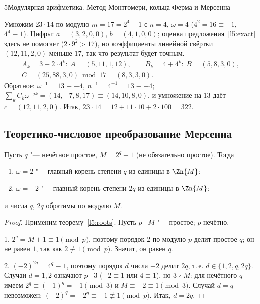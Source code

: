 \begin{lecture}{5}{Модулярная арифметика. Метод Монтгомери, кольца Ферма и Мерсенна}
\begin{example}\label{l5:ntt17}
Умножим $23 \cdot 14$ по модулю $m = 17 = 2^4 + 1$ с $n = 4$, $\omega = 4$
($4^2 = 16 \equiv -1$, $4^4 \equiv 1$). Цифры: $a = (3, 2, 0, 0)$, $b = (4, 1, 0, 0)$;
оценка предложения~\ref{l5:exact} здесь не помогает ($2 \cdot 9^2 > 17$), но коэффициенты
линейной свёртки $(12, 11, 2, 0)$ меньше $17$, так что результат будет точным.
\begin{gather*}
  A_k = 3 + 2 \cdot 4^k:\ A = (5, 11, 1, 12), \qquad
  B_k = 4 + 4^k:\ B = (5, 8, 3, 0),\\
  C = (25, 88, 3, 0) \bmod 17 = (8, 3, 3, 0).
\end{gather*}
Обратное: $\omega^{-1} = 13 \equiv -4$, $n^{-1} = 4^{-1} = 13 \equiv -4$;
$\sum_k C_k \omega^{-jk} = (14, -7, 8, 17) \equiv (14, 10, 8, 0)$, и умножение на $13$ даёт
$c = (12, 11, 2, 0)$. Итак, $23 \cdot 14 = 12 + 11 \cdot 10 + 2 \cdot 100 = 322$.
\end{example}


\subsection{Теоретико-числовое преобразование Мерсенна}

\begin{theorem}\label{l5:mnt}
Пусть $q$ "--- нечётное простое, $M = 2^q - 1$ (не обязательно простое). Тогда
\begin{enumerate}
  \item $\omega = 2$ "--- главный корень степени $q$ из единицы в $\Zn{M}$;
  \item $\omega = -2$ "--- главный корень степени $2q$ из единицы в $\Zn{M}$;
\end{enumerate}
и числа $q$, $2q$ обратимы по модулю $M$.
\end{theorem}

\begin{proof}
Применим теорему~\ref{l5:roots}. Пусть $p \mid M$ "--- простое; $p$ нечётно.

1. $2^q = M + 1 \equiv 1 \pmod p$, поэтому порядок $2$ по модулю $p$ делит простое $q$; он не
равен $1$, так как $2 \not\equiv 1 \pmod p$. Значит, он равен $q$.

2. $(-2)^{2q} = 4^q \equiv 1$, поэтому порядок $d$ числа $-2$ делит $2q$, т.\,е.
$d \in \{1, 2, q, 2q\}$. Случаи $d = 1, 2$ означают $p \mid 3$ ($-2 \equiv 1$ или $4 \equiv 1$),
но $3 \nmid M$: для нечётного $q$ имеем $2^q \equiv (-1)^q = -1 \pmod 3$ и
$M \equiv -2 \equiv 1 \pmod 3$. Случай $d = q$ невозможен: $(-2)^q = -2^q \equiv -1
\not\equiv 1 \pmod p$. Итак, $d = 2q$.


\end{proof}
\end{lecture}

